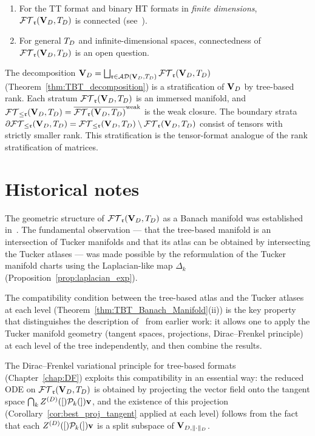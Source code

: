 \begin{proposition}
\label{prop:TBT_connected_cases}
\begin{enumerate}
\item[\textup{(i)}] For the TT format and binary HT formats in
    \emph{finite dimensions}, $\mathcal{FT}_{\mathfrak{r}}(\mathbf{V}_D,T_D)$ is connected
    (see~\cite{UschmajewVandereycken2013, HoltzRohwedderSchneider2012}).
\item[\textup{(ii)}] For general $T_D$ and infinite-dimensional
    spaces, connectedness of $\mathcal{FT}_{\mathfrak{r}}(\mathbf{V}_D,T_D)$ is an open question.
\end{enumerate}
\end{proposition}

\begin{remark}[Stratification]
\label{rem:stratification}
The decomposition
$\mathbf{V}_D = \bigsqcup_{\mathfrak{r} \in \mathcal{AD}(\mathbf{V}_D,T_D)} \mathcal{FT}_{\mathfrak{r}}(\mathbf{V}_D,T_D)$
(Theorem~\ref{thm:TBT_decomposition}) is a stratification of $\mathbf{V}_D$
by tree-based rank. Each stratum $\mathcal{FT}_{\mathfrak{r}}(\mathbf{V}_D,T_D)$ is an immersed manifold,
and $\mathcal{FT}_{\leq \mathfrak{r}}(\mathbf{V}_D,T_D) = \overline{\mathcal{FT}_{\mathfrak{r}}(\mathbf{V}_D,T_D)}^{\text{weak}}$
is the weak closure. The boundary strata
$\partial \mathcal{FT}_{\leq \mathfrak{r}}(\mathbf{V}_D,T_D) = \mathcal{FT}_{\leq \mathfrak{r}}(\mathbf{V}_D,T_D) \setminus \mathcal{FT}_{\mathfrak{r}}(\mathbf{V}_D,T_D)$
consist of tensors with strictly smaller rank.
This stratification is the tensor-format analogue of the rank
stratification of matrices.
\end{remark}

\section{Historical notes}
\label{sec:TB_manifold:history}

The geometric structure of $\mathcal{FT}_{\mathfrak{r}}(\mathbf{V}_D,T_D)$ as a Banach manifold was established
in~\cite{FHN2023}. The fundamental observation — that the tree-based
manifold is an intersection of Tucker manifolds and that its atlas can
be obtained by intersecting the Tucker atlases — was made possible by
the reformulation of the Tucker manifold charts using the Laplacian-like
map $\Delta_k$ (Proposition~\ref{prop:laplacian_exp}).

The compatibility condition between the tree-based atlas and the Tucker
atlases at each level (Theorem~\ref{thm:TBT_Banach_Manifold}(ii)) is
the key property that distinguishes the description of~\cite{FHN2023}
from earlier work: it allows one to apply the Tucker manifold geometry
(tangent spaces, projections, Dirac--Frenkel principle) at each level
of the tree independently, and then combine the results.

The Dirac--Frenkel variational principle for tree-based formats
(Chapter~\ref{chap:DF}) exploits this compatibility in an essential
way: the reduced ODE on $\mathcal{FT}_{\mathfrak{r}}(\mathbf{V}_D,T_D)$ is obtained by projecting the vector
field onto the tangent space $\bigcap_k Z^{(D)}([)\mathcal{P}_{k}(]){\mathbf{v}}$, and the
existence of this projection (Corollary~\ref{cor:best_proj_tangent}
applied at each level) follows from the fact that each $Z^{(D)}([)\mathcal{P}_{k}(]){\mathbf{v}}$
is a split subspace of $\mathbf{V}_{D,\|\cdot\|_D}$.

